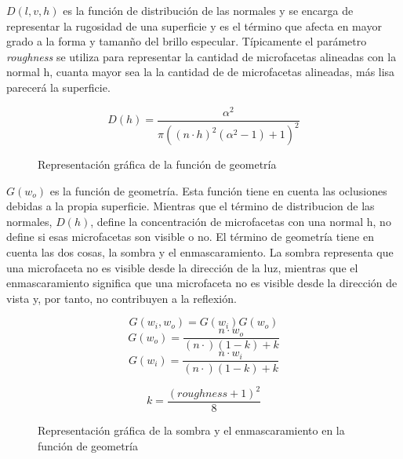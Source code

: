         $D(l, v, h)$  es la funci\'on de distribuci\'on de las normales y se encarga de representar la rugosidad de una superficie
        y es el t\'ermino que afecta en mayor grado a la forma y taman\~no del brillo especular. T\'ipicamente el par\'ametro
        \textit{roughness} se utiliza para representar la cantidad de microfacetas alineadas con la normal h, cuanta mayor sea la
        la cantidad de de microfacetas alineadas, m\'as lisa parecer\'a la superficie.

        $$
        D(h) = \frac{\alpha^2}{\pi((n\cdot{h})^2(\alpha^2 - 1) + 1)^2}
        $$

        \begin{figure}[H]
            \vspace{0.5cm}
            \centering
            \caption{Representaci\'on gr\'afica de la funci\'on de geometr\'ia}
        \end{figure}

        $G(w_o)$ es la funci\'on de geometr\'ia. Esta funci\'on tiene en cuenta las oclusiones debidas a la propia superficie.
        Mientras que el t\'ermino de distribucion de las normales, $D(h)$, define la concentraci\'on de microfacetas con una normal h,
        no define si esas microfacetas son visible o no. El t\'ermino de geometr\'ia tiene en cuenta las dos cosas, la sombra
        y el enmascaramiento. La sombra representa que una microfaceta no es visible desde la direcci\'on de la luz, mientras que el
        enmascaramiento significa que una microfaceta no es visible desde la direcci\'on de vista y, por tanto, no contribuyen
        a la reflexi\'on.

        $$
        G(w_i, w_o) = G(w_i)G(w_o)
        $$
        \singlespacing
        $$
        G(w_o) = \frac{n\cdot{w_o}}{(n\cdot) (1 - k) + k}
        $$
        \singlespacing
        $$
        G(w_i) = \frac{n\cdot{w_i}}{(n\cdot) (1 - k) + k}
        $$
        \singlespacing

        \begin{equation}
        k = \frac{(roughness + 1)^2}{8}
        \end{equation}

        \begin{figure}[H]
            \vspace{0.5cm}
            \centering
            \caption{Representaci\'on gr\'afica de la sombra y el enmascaramiento en la funci\'on de geometr\'ia}
        \end{figure}

